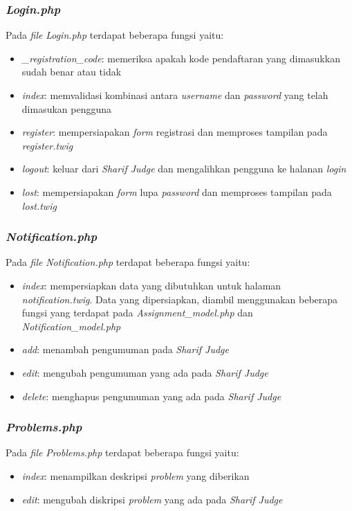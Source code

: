 \subsubsection{\textit{Login.php}}
Pada \textit{file} \textit{Login.php} terdapat beberapa fungsi yaitu:
\begin{itemize}
	\item \textit{\_registration\_code}: memeriksa apakah kode pendaftaran yang dimasukkan sudah benar atau tidak
	\item \textit{index}: memvalidasi kombinasi antara \textit{username} dan \textit{password} yang telah dimasukan pengguna
	\item \textit{register}: mempersiapakan \textit{form} registrasi dan memproses tampilan pada \textit{register.twig}
	\item \textit{logout}: keluar dari \textit{Sharif Judge} dan mengalihkan pengguna ke halanan \textit{login}
	\item \textit{lost}: mempersiapakan \textit{form} lupa \textit{password} dan memproses tampilan pada \textit{lost.twig}
\end{itemize}

\subsubsection{\textit{Notification.php}}
Pada \textit{file} \textit{Notification.php} terdapat beberapa fungsi yaitu:
\begin{itemize}
	\item \textit{index}: mempersiapkan data yang dibutuhkan untuk halaman \textit{notification.twig}. Data yang dipersiapkan, diambil menggunakan beberapa fungsi yang terdapat pada \textit{Assignment\_model.php} dan \textit{Notification\_model.php}
	\item \textit{add}: menambah pengumuman pada \textit{Sharif Judge}
	\item \textit{edit}: mengubah pengumuman yang ada pada \textit{Sharif Judge}
	\item \textit{delete}: menghapus pengumuman yang ada pada \textit{Sharif Judge}
\end{itemize}

\subsubsection{\textit{Problems.php}}
Pada \textit{file} \textit{Problems.php} terdapat beberapa fungsi yaitu:
\begin{itemize}
	\item \textit{index}: menampilkan deskripsi \textit{problem} yang diberikan
	\item \textit{edit}: mengubah diskripsi \textit{problem} yang ada pada \textit{Sharif Judge}
\end{itemize}

